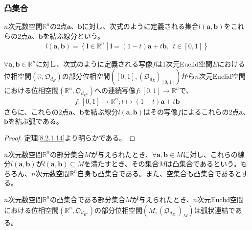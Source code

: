 \documentclass[dvipdfmx]{jsarticle}
\begin{document}
\subsubsection{凸集合}%
\begin{dfn}
$n$次元数空間$\mathbb{R}^{n}$の2点$\mathbf{a}$、$\mathbf{b}$に対し、次式のように定義される集合$l\left( \mathbf{a},\mathbf{b} \right)$をこれらの2点$\mathbf{a}$、$\mathbf{b}$を結ぶ線分という。
\begin{align*}
l\left( \mathbf{a},\mathbf{b} \right) = \left\{ \mathbf{l} \in \mathbb{R}^{n} \middle| \mathbf{l} = (1 - t)\mathbf{a} + t\mathbf{b},\ \ t \in [ 0,1] \right\}
\end{align*}
\end{dfn}
\begin{thm}\label{8.2.2.20}
$\forall\mathbf{a},\mathbf{b} \in \mathbb{R}^{n}$に対し、次式のように定義される写像$f$は1次元Euclid空間$E$における位相空間$\left( \mathbb{R},\mathfrak{O}_{d_{E}} \right)$の部分位相空間$\left( [ 0,1],\left( \mathfrak{O}_{d_{E}} \right)_{[ 0,1]} \right)$から$n$次元Euclid空間における位相空間$\left( \mathbb{R}^{n},\mathfrak{O}_{d_{E^{n}}} \right)$への連続写像$f:[ 0,1] \rightarrow \mathbb{R}^{n}$で、
\begin{align*}
f:[ 0,1] \rightarrow \mathbb{R}^{n};t \mapsto (1 - t)\mathbf{a} + t\mathbf{b}
\end{align*}
さらに、これらの2点$\mathbf{a}$、$\mathbf{b}$を結ぶ線分$l\left( \mathbf{a},\mathbf{b} \right)$はその写像$f$によるこれらの2点$\mathbf{a}$、$\mathbf{b}$を結ぶ弧である。
\end{thm}
\begin{proof} 定理\ref{8.2.1.14}より明らかである。
\end{proof}
\begin{dfn}
$n$次元数空間$\mathbb{R}^{n}$の部分集合$M$が与えられたとき、$\forall\mathbf{a},\mathbf{b} \in M$に対し、これらの線分$l\left( \mathbf{a},\mathbf{b} \right)$が$l\left( \mathbf{a},\mathbf{b} \right) \subseteq M$を満たすとき、その集合$M$は凸集合であるという。もちろん、$n$次元数空間$\mathbb{R}^{n}$自身も凸集合である。また、空集合も凸集合であるとする。
\end{dfn}
\begin{thm}\label{8.2.2.21}
$n$次元数空間$\mathbb{R}^{n}$の凸集合である部分集合$M$が与えられたとき、$n$次元Euclid空間における位相空間$\left( \mathbb{R}^{n},\mathfrak{O}_{d_{E^{n}}} \right)$の部分位相空間$\left( M,\left( \mathfrak{O}_{d_{E^{n}}} \right)_{M} \right)$は弧状連結である。
\end{thm}
\end{document}
